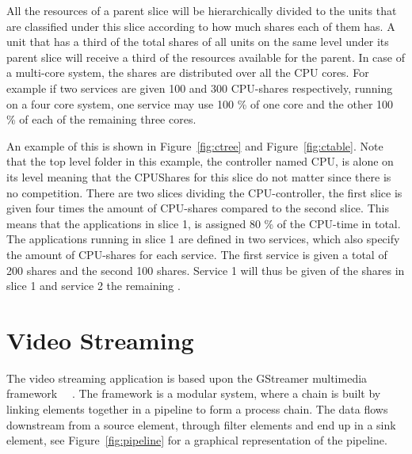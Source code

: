 \documentclass[nobiblatex]{LTHthesis}
\begin{document}
All the resources of a parent slice will be hierarchically divided to the
units that are classified under this slice according to how much shares
each of them has. A unit that has a third of the total shares of all units
on the same level under its parent slice will receive a third of the
resources available for the parent. In case of a multi-core system, the shares are distributed over all the CPU cores. For example if two services are given 100 and 300 CPU-shares respectively, running on a four core system, one service may use 100 \% of one core and the other 100 \% of each of the remaining three cores.

An example of this is shown in 
Figure~\ref{fig:ctree} and Figure~\ref{fig:ctable}. Note that the top 
level folder in this example, the controller named CPU, is alone on its
level meaning that the CPUShares for this slice do not matter since there
is no competition. There are two slices dividing the CPU-controller, the first slice is given four times the amount of CPU-shares compared to the second slice. This means that the applications in slice 1, is assigned 80 \% of the CPU-time in total. The applications running in slice 1 are defined in two services, which also specify the amount of CPU-shares for each service. The first service is given a total of 200 shares and the second 100 shares. Service 1 will thus be given  of the shares in slice 1 and service 2 the remaining .



\section{Video Streaming}

The video streaming application is based upon the GStreamer multimedia
framework ~\cite{gst}~\cite{gst-tutorial}. The framework is a modular system, where a chain is built by
linking elements together in a pipeline to form a process chain. 
The data flows downstream from a source element, through filter elements 
and end up in a sink element, see Figure~\ref{fig:pipeline} for a graphical
representation of the pipeline. 
\end{document}
